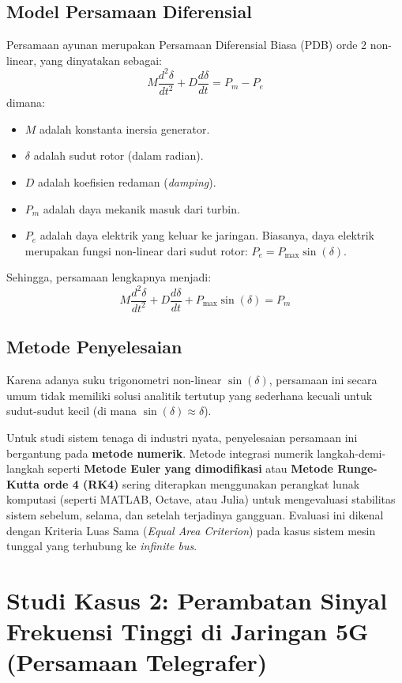 \documentclass[12pt,a4paper]{article}
\theoremstyle{definition}
\begin{document}
\subsection{Model Persamaan Diferensial}
Persamaan ayunan merupakan Persamaan Diferensial Biasa (PDB) orde 2 non-linear, yang dinyatakan sebagai:
\begin{equation}
    M \frac{d^2 \delta}{dt^2} + D \frac{d \delta}{dt} = P_m - P_e
\end{equation}
dimana:
\begin{itemize}
    \item $M$ adalah konstanta inersia generator.
    \item $\delta$ adalah sudut rotor (dalam radian).
    \item $D$ adalah koefisien redaman (\textit{damping}).
    \item $P_m$ adalah daya mekanik masuk dari turbin.
    \item $P_e$ adalah daya elektrik yang keluar ke jaringan. Biasanya, daya elektrik merupakan fungsi non-linear dari sudut rotor: $P_e = P_{\max} \sin(\delta)$.
\end{itemize}
Sehingga, persamaan lengkapnya menjadi:
\begin{equation}
    M \frac{d^2 \delta}{dt^2} + D \frac{d \delta}{dt} + P_{\max} \sin(\delta) = P_m
\end{equation}

\subsection{Metode Penyelesaian}
Karena adanya suku trigonometri non-linear $\sin(\delta)$, persamaan ini secara umum tidak memiliki solusi analitik tertutup yang sederhana kecuali untuk sudut-sudut kecil (di mana $\sin(\delta) \approx \delta$). 

Untuk studi sistem tenaga di industri nyata, penyelesaian persamaan ini bergantung pada \textbf{metode numerik}. Metode integrasi numerik langkah-demi-langkah seperti \textbf{Metode Euler yang dimodifikasi} atau \textbf{Metode Runge-Kutta orde 4 (RK4)} sering diterapkan menggunakan perangkat lunak komputasi (seperti MATLAB, Octave, atau Julia) untuk mengevaluasi stabilitas sistem sebelum, selama, dan setelah terjadinya gangguan. Evaluasi ini dikenal dengan Kriteria Luas Sama (\textit{Equal Area Criterion}) pada kasus sistem mesin tunggal yang terhubung ke \textit{infinite bus}.

\section{Studi Kasus 2: Perambatan Sinyal Frekuensi Tinggi di Jaringan 5G (Persamaan Telegrafer)}
\end{document}
